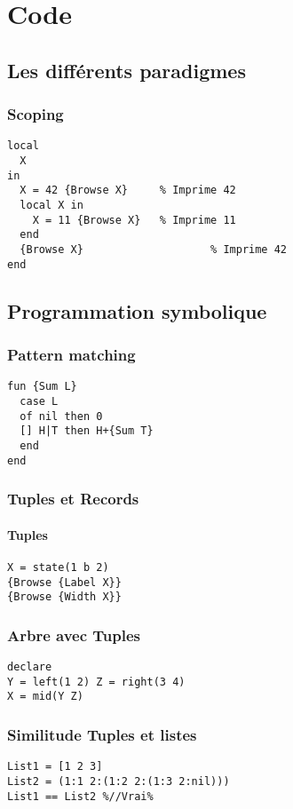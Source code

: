 \documentclass{report}
\begin{document}
\chapter{Code}
\section{Les différents paradigmes}
\subsection{Scoping}
\begin{lstlisting}
local
  X
in 
  X = 42 {Browse X}		% Imprime 42
  local X in
    X = 11 {Browse X}	% Imprime 11
  end
  {Browse X}					% Imprime 42
end
\end{lstlisting}
    
\section{Programmation symbolique}
\subsection{Pattern matching}
\begin{lstlisting}[escapechar=\%]
fun {Sum L}
  case L
  of nil then 0
  [] H|T then H+{Sum T}
  end
end
\end{lstlisting}

\subsection{Tuples et Records}
\subsubsection{Tuples}
\begin{lstlisting}
X = state(1 b 2)
{Browse {Label X}}
{Browse {Width X}}
\end{lstlisting}

\subsection{Arbre avec Tuples}
\begin{lstlisting}
declare
Y = left(1 2) Z = right(3 4)
X = mid(Y Z)
\end{lstlisting}

\subsection{Similitude Tuples et listes}
\begin{lstlisting}[escapechar=\%]
List1 = [1 2 3]
List2 = (1:1 2:(1:2 2:(1:3 2:nil)))
List1 == List2 %//Vrai%
\end{lstlisting}
\end{document}
